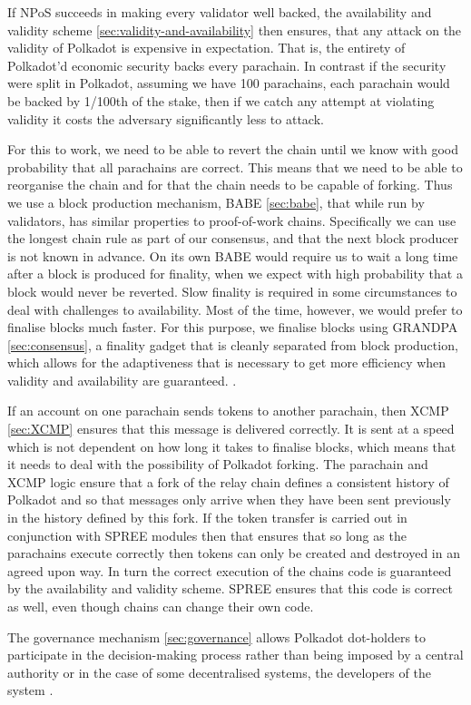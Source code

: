 If NPoS succeeds in making every validator well backed, the availability and validity scheme \ref{sec:validity-and-availability} then ensures, that any attack on the validity of Polkadot is expensive in expectation. That is, the entirety of Polkadot'd economic security backs every parachain. In contrast if the security were split in Polkadot, assuming we have 100 parachains, each parachain would be backed by 1/100th of the stake, then if we catch any attempt at violating validity it costs the adversary significantly less to attack.  

For this to work, we need to be able to revert the chain until we know with good probability that all parachains are correct. This means that we need to be able to reorganise the chain and for that the chain needs to be capable of forking. Thus we use a block production mechanism, BABE \ref{sec:babe}, that while run by validators, has similar properties to proof-of-work chains. Specifically we can use the longest chain rule as part of our consensus, and that the next block producer is not known in advance. On its own BABE would require us to wait a long time after a block is produced for finality, when we expect with high probability that a block would never be reverted. Slow finality is required in some circumstances to deal with challenges to availability. Most of the time, however, we would prefer to finalise blocks much faster.  For this purpose, we
 finalise blocks using GRANDPA \ref{sec:consensus}, a finality gadget that is cleanly separated from block production, which allows for the adaptiveness that is necessary to get more efficiency when validity and availability are guaranteed. . 

If an account on one parachain sends tokens to another parachain, then XCMP \ref{sec:XCMP} ensures that this message is delivered correctly. It is sent at a speed which is not dependent on how long it takes to finalise blocks, which means that it needs to deal with the possibility of Polkadot forking. The parachain and XCMP logic ensure that a fork of the relay chain defines a consistent history of Polkadot and so that messages only arrive when they have been sent previously in the history defined by this fork. If the token transfer is carried out in conjunction with SPREE modules then that ensures that so long as the parachains execute correctly then tokens can only be created and destroyed in an agreed upon way. In turn the correct execution of the chains code is guaranteed by the availability and validity scheme. SPREE ensures that this code is correct as well, even though chains can change their own code.

The governance mechanism \ref{sec:governance} allows Polkadot dot-holders to participate in the decision-making process rather than being imposed by a central authority or in the case of some decentralised systems, the developers of the system .  

